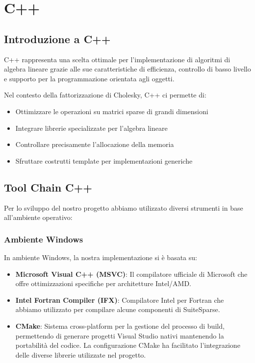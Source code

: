\chapter{C++}

\section{Introduzione a C++}

C++ rappresenta una scelta ottimale per l'implementazione di algoritmi di algebra lineare grazie alle sue caratteristiche 
di efficienza, controllo di basso livello e supporto per la programmazione orientata agli oggetti.

Nel contesto della fattorizzazione di Cholesky, C++ ci permette di:
\begin{itemize}
    \item Ottimizzare le operazioni su matrici sparse di grandi dimensioni
    \item Integrare librerie specializzate per l'algebra lineare
    \item Controllare precisamente l'allocazione della memoria
    \item Sfruttare costrutti template per implementazioni generiche
\end{itemize}

\section{Tool Chain C++}

Per lo sviluppo del nostro progetto abbiamo utilizzato diversi strumenti in base all'ambiente operativo:

\subsection{Ambiente Windows}
In ambiente Windows, la nostra implementazione si è basata su:

\begin{itemize}
    \item \textbf{Microsoft Visual C++ (MSVC)}: Il compilatore ufficiale di Microsoft che offre ottimizzazioni specifiche per 
    architetture Intel/AMD.
    
    \item \textbf{Intel Fortran Compiler (IFX)}: Compilatore Intel per Fortran che abbiamo utilizzato per compilare alcune componenti di SuiteSparse.

    \item \textbf{CMake}: Sistema cross-platform per la gestione del processo di build, permettendo di generare progetti 
    Visual Studio nativi mantenendo la portabilità del codice. La configurazione CMake ha facilitato l'integrazione delle diverse 
    librerie utilizzate nel progetto.
\end{itemize}

